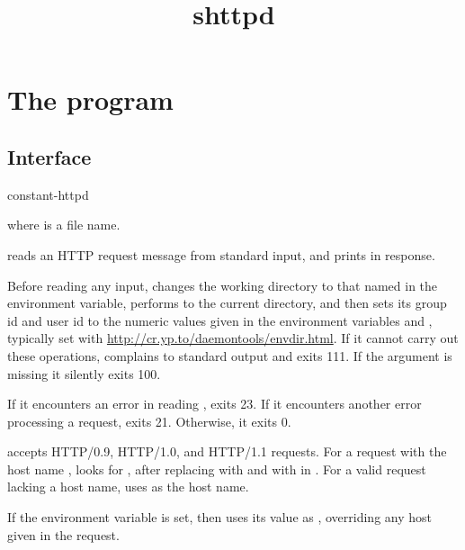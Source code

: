 \documentclass{book}
\title{shttpd}
\begin{document}
\section{The  program}

\subsection{Interface}
\begin{code}
  constant-httpd 
\end{code}
where  is a file name.

 reads an HTTP request message from standard input,
and prints  in response.

Before reading any input,  changes the working
directory to that named in the  environment variable,
performs  to the current directory, and then sets its
group id and user id to the numeric values given in the environment
variables  and , typically set with
\href{\cmd{envdir}}{http://cr.yp.to/daemontools/envdir.html}.
If it cannot carry out these operations, 
complains to standard output and exits 111.  If the 
argument is missing it silently exits 100.

If it encounters an error in reading , 
exits 23.  If it encounters another error processing a request,
 exits 21.  Otherwise, it exits 0.

 accepts HTTP/0.9, HTTP/1.0, and HTTP/1.1
requests.  For a request with the host name ,
 looks for , after
replacing  with \cmd{/:} and \cmd{//} with \cmd{/} in
.  For a valid request lacking a host name,
 uses  as the host name.

If the environment variable  is set, then
 uses its value as , overriding any host given in
the request.
\end{document}
